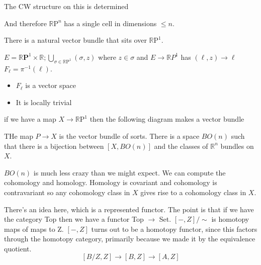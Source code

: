 \documentclass[12pt]{article}
\theoremstyle{definition}
\begin{document}
	The CW structure on this is determined 
	
	\begin{center}
	\end{center}
	And therefore $\mathbb{R}\text{P}^n$ has a single cell in dimensions $\leq n$. 
	
	There is a natural vector bundle that sits over $\mathbb{R}\text{P}^1$. 
	\begin{center}
	\end{center}
	$E=\mathbb{R}\textbf{P}^1\times \mathbb{R};  \bigcup_{\sigma\in \mathbb{R}\text{P}^1}(\sigma,z)$ where $z\in \sigma$ and $E\to \mathbb{R} P^1$ has $(\ell,z)\to \ell$
	$F_\ell=\pi^{-1}(\ell)$. \begin{itemize}
		\item $F_\ell$ is a vector space
		\item It is locally trivial 
	\end{itemize}
	if we have a map $X\to \mathbb{R} \text{P}^1$ then the following diagram makes a vector bundle
	\begin{center}
	\end{center}
	THe map $P\to X$ is the vector bundle of sorts.
	There is a space $BO(n)$ such that there is a bijection between $[X,BO(n)]$ and the classes of $\mathbb{R}^n$ bundles on $X$. 
	
	$BO(n)$ is much less crazy than we might expect. We can compute the cohomology and homology. Homology is covariant and cohomology is contravariant so any cohomology class in $X$ gives rise to a cohomology class in $X$.  
	
	There's an idea here, which is a represented functor. The point is that if we have the category \textsf{Top} then we have a functor \textsf{Top} $\to$ \textsf{Set}.  $[-,Z]/\sim$ is homotopy maps of maps to Z. $[-,Z]$ turns out to be a homotopy functor, since this factors through the homotopy category, primarily because we made it by the equivalence quotient. 
	\[
	[B/Z,Z]\to [B,Z]\to [A,Z]
	\]
	
\end{document}
